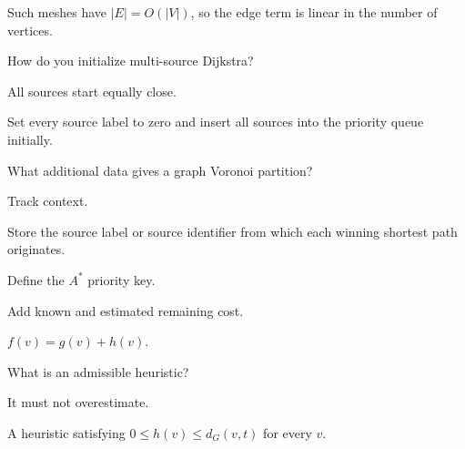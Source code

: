 \begin{solution}
Such meshes have \(|E|=O(|V|)\), so the edge term is linear in the number of vertices.
\end{solution}

\begin{exercise}\label{exr:vii39-06}
How do you initialize multi-source Dijkstra?
\end{exercise}

\begin{hint}
All sources start equally close.
\end{hint}

\begin{solution}
Set every source label to zero and insert all sources into the priority queue initially.
\end{solution}

\begin{exercise}\label{exr:vii39-07}
What additional data gives a graph Voronoi partition?
\end{exercise}

\begin{hint}
Track context.
\end{hint}

\begin{solution}
Store the source label or source identifier from which each winning shortest path originates.
\end{solution}

\begin{exercise}\label{exr:vii39-08}
Define the \(A^\ast\) priority key.
\end{exercise}

\begin{hint}
Add known and estimated remaining cost.
\end{hint}

\begin{solution}
\(f(v)=g(v)+h(v)\).
\end{solution}

\begin{exercise}\label{exr:vii39-09}
What is an admissible heuristic?
\end{exercise}

\begin{hint}
It must not overestimate.
\end{hint}

\begin{solution}
A heuristic satisfying \(0\le h(v)\le d_G(v,t)\) for every \(v\).
\end{solution}

